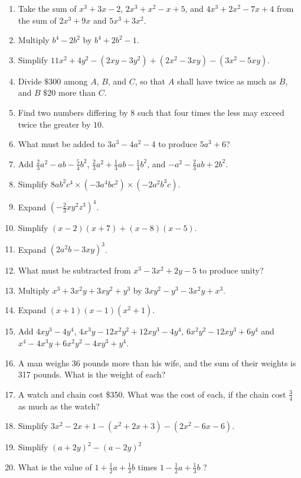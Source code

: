 \documentclass{book}
\begin{document}
\begin{enumerate}

\item Take the sum of $x^3 + 3x - 2$, $2x^3 + x^2 - x + 5$, and
$4x^3 + 2x^2 - 7x + 4$ from the sum of $2x^3 + 9x$ and $5x^3 +
3x^2$.

\item Multiply $b^4 - 2b^2$ by $b^4 + 2b^2 - 1$.

\item Simplify $11x^2 + 4y^2 - (2xy - 3y^2) + (2x^2 - 3xy) - (3x^2
- 5xy)$.

\item Divide $\$300$ among $A$, $B$, and $C$, so that $A$ shall
have twice as much as $B$, and $B$ $\$20$ more than $C$.

\item Find two numbers differing by $8$ such that four times the
less may exceed twice the greater by $10$.

\item What must be added to $3a^3 - 4a^2 - 4$ to produce $5a^3 +
6$?

\item Add $\frac{2}{3}a^2 - ab - \frac{5}{4}b^2$, $\frac{2}{3}a^2
+ \frac{1}{3}ab - \frac{1}{4}b^2$, and $-a^2 -\frac{2}{3}ab +
2b^2$.

\item Simplify $8ab^2c^4 \times (-3a^4bc^2) \times (-2a^2b^3c)$.

\item Expand $\left(-\frac{2}{3}xy^2z^3\right)^4$.

\item Simplify $(x-2)(x+7) + (x-8)(x-5)$.

\item Expand $(2a^2b-3xy)^3$.

\item What must be subtracted from $x^3-3x^2+2y-5$ to produce
unity?

\item Multiply $x^3+ 3x^2y+3xy^2 + y^3$ by $3xy^2 -
y^3-3x^2y+x^3$.

\item Expand $(x+1)(x-1)(x^2+1)$.

\item Add $4xy^3-4y^4$, $4x^3y-12x^2y^2+12xy^3-4y^4$,
$6x^2y^2-12xy^3+6y^4$ and $x^4-4x^3y+6x^2y^2-4xy^3+y^4$.

\item A man weighs 36 pounds more than his wife, and the sum of
their weights is 317 pounds. What is the weight of each?

\item A watch and chain cost \$350. What was the cost of each, if
the chain cost $\frac{3}{4}$ as much as the watch?

\item Simplify $3x^2-2x+1-(x^2+2x+3)-(2x^2-6x-6)$.

\item Simplify $(a + 2y)^2-(a-2y)^2$

\item What is the value of $1 + \frac{1}{2}a + \frac{1}{3}b$ times
$1- \frac{1}{2}a + \frac{1}{3}b$ ?
\end{enumerate}
\end{document}
